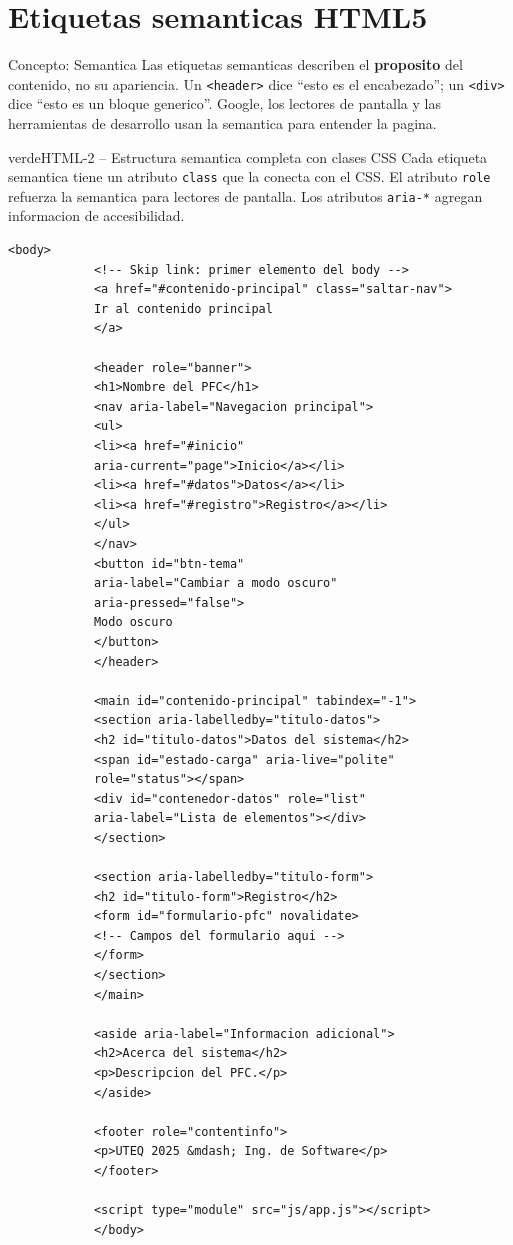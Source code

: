 \documentclass[11pt,a4paper]{article}
\begin{document}
	\section{Etiquetas semanticas HTML5}
	
	\begin{cajaconcepto}{Concepto: Semantica}
		Las etiquetas semanticas describen el \textbf{proposito} del contenido, no su apariencia. Un \texttt{<header>} dice ``esto es el encabezado''; un \texttt{<div>} dice ``esto es un bloque generico''. Google, los lectores de pantalla y las herramientas de desarrollo usan la semantica para entender la pagina.
	\end{cajaconcepto}
	
	\begin{cajacodigo}{verde}{HTML-2 -- Estructura semantica completa con clases CSS}
		{\color{codigotexto}\small Cada etiqueta semantica tiene un atributo \texttt{class} que la conecta con el CSS. El atributo \texttt{role} refuerza la semantica para lectores de pantalla. Los atributos \texttt{aria-*} agregan informacion de accesibilidad.}
		\begin{lstlisting}[style=codehtml]
			<body>
			<!-- Skip link: primer elemento del body -->
			<a href="#contenido-principal" class="saltar-nav">
			Ir al contenido principal
			</a>
			
			<header role="banner">
			<h1>Nombre del PFC</h1>
			<nav aria-label="Navegacion principal">
			<ul>
			<li><a href="#inicio"
			aria-current="page">Inicio</a></li>
			<li><a href="#datos">Datos</a></li>
			<li><a href="#registro">Registro</a></li>
			</ul>
			</nav>
			<button id="btn-tema"
			aria-label="Cambiar a modo oscuro"
			aria-pressed="false">
			Modo oscuro
			</button>
			</header>
			
			<main id="contenido-principal" tabindex="-1">
			<section aria-labelledby="titulo-datos">
			<h2 id="titulo-datos">Datos del sistema</h2>
			<span id="estado-carga" aria-live="polite"
			role="status"></span>
			<div id="contenedor-datos" role="list"
			aria-label="Lista de elementos"></div>
			</section>
			
			<section aria-labelledby="titulo-form">
			<h2 id="titulo-form">Registro</h2>
			<form id="formulario-pfc" novalidate>
			<!-- Campos del formulario aqui -->
			</form>
			</section>
			</main>
			
			<aside aria-label="Informacion adicional">
			<h2>Acerca del sistema</h2>
			<p>Descripcion del PFC.</p>
			</aside>
			
			<footer role="contentinfo">
			<p>UTEQ 2025 &mdash; Ing. de Software</p>
			</footer>
			
			<script type="module" src="js/app.js"></script>
			</body>
		\end{lstlisting}
	\end{cajacodigo}
	
\end{document}
